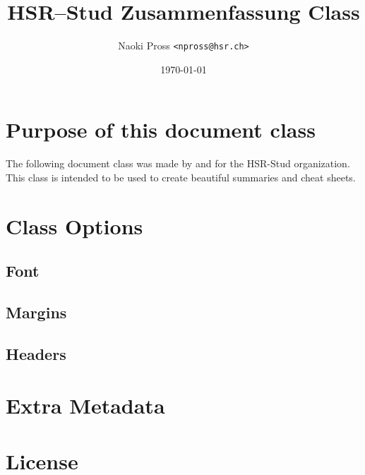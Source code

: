 \documentclass[concrete, header, margin=large]{hsrzf}
\title{\textcolor{hsr-blue}{HSR}--Stud Zusammenfassung Class}
\author{Naoki Pross \texttt{<npross@hsr.ch>}}
\date{\today}
\begin{document}
\maketitle
\tableofcontents

\section{Purpose of this document class}
The following document class was made by and for the HSR-Stud organization. This class is intended to be used to create beautiful summaries and cheat sheets.

\section{Class Options}
\subsection{Font}
\subsection{Margins}
\subsection{Headers}

\section{Extra Metadata}

\section{License}
\doclicenseThis
\end{document}
